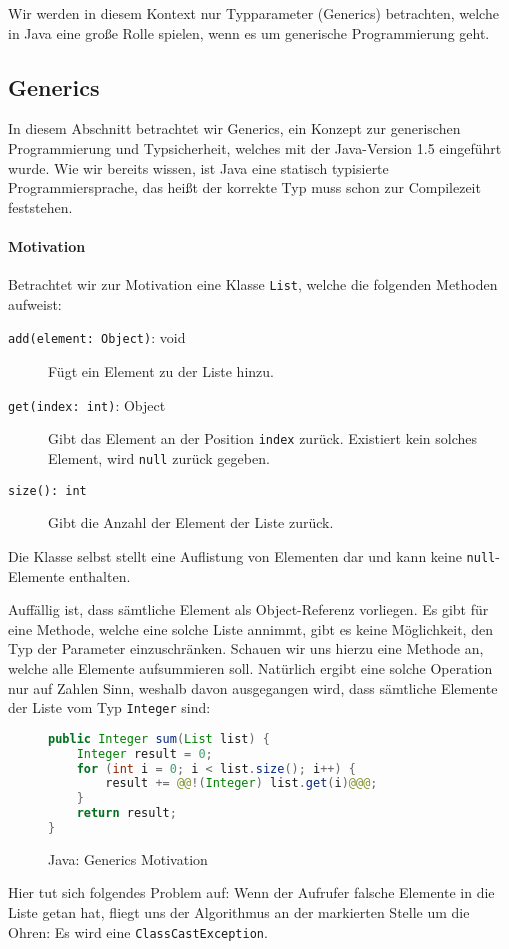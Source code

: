 
Wir werden in diesem Kontext nur Typparameter (Generics) betrachten, welche in Java eine große Rolle spielen, wenn es um generische Programmierung geht.

\subsection{Generics}
	\label{sec:generics}

	In diesem Abschnitt betrachtet wir Generics, ein Konzept zur generischen Programmierung und Typsicherheit, welches mit der Java-Version 1.5 eingeführt wurde. Wie wir bereits wissen, ist Java eine statisch typisierte Programmiersprache, das heißt der korrekte Typ muss schon zur Compilezeit feststehen.
	
	\paragraph{Motivation}
		Betrachtet wir zur Motivation eine Klasse \texttt{List}, welche die folgenden Methoden aufweist:
		\begin{description}
			\item[\texttt{add(element: Object)}: void] Fügt ein Element zu der Liste hinzu.
			\item[\texttt{get(index: int)}: Object] Gibt das Element an der Position \texttt{index} zurück. Existiert kein solches Element, wird \texttt{null} zurück gegeben.
			\item[\texttt{size(): int}] Gibt die Anzahl der Element der Liste zurück.
		\end{description}
		Die Klasse selbst stellt eine Auflistung von Elementen dar und kann keine \texttt{null}-Elemente enthalten.
		
		Auffällig ist, dass sämtliche Element als Object-Referenz vorliegen. Es gibt für eine Methode, welche eine solche Liste annimmt, gibt es keine Möglichkeit, den Typ der Parameter einzuschränken. Schauen wir uns hierzu eine Methode an, welche alle Elemente aufsummieren soll. Natürlich ergibt eine solche Operation nur auf Zahlen Sinn, weshalb davon ausgegangen wird, dass sämtliche Elemente der Liste vom Typ \texttt{Integer} sind:
		\begin{figure}[H]
			\centering
			\begin{lstlisting}[language = Java, style = base]
public Integer sum(List list) {
	Integer result = 0;
	for (int i = 0; i < list.size(); i++) {
		result += @@!(Integer) list.get(i)@@@;
	}
	return result;
}
			\end{lstlisting}
			\caption{Java: Generics Motivation}
			\label{fig:generics_motivation}
		\end{figure}
		Hier tut sich folgendes Problem auf: Wenn der Aufrufer falsche Elemente in die Liste getan hat, fliegt uns der Algorithmus an der markierten Stelle um die Ohren: Es wird eine \texttt{ClassCastException}.
		
